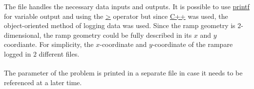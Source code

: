 The file handles the necessary data inputs and outputs. It is possible to use \url{printf} for variable output and using the \url{>} operator but since \url{C++} was used, the object-oriented method of logging data was used. Since the ramp geometry is $2$-dimensional, the ramp geometry could be fully described in its $x$ and $y$ coordiante. For simplicity, the $x$-coordinate and $y$-coordinate of the rampare logged in $2$ different files.
\\~\\The parameter of the problem is printed in a separate file in case it needs to be referenced at a later time.

